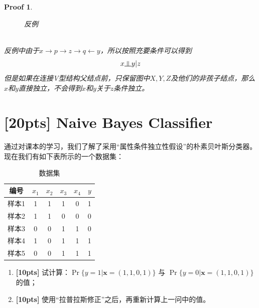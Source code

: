 \documentclass[a4paper,UTF8]{article}
\numberwithin{equation}{section}
\newtheorem*{myProof}{Proof}
\newcommand{\indep}{\rotatebox[origin=c]{90}{$\models$}}
\begin{document}
\begin{myProof}
\begin{enumerate}[(1)]
\begin{figure}[!ht]
	\caption{反例}
	\label{fig:label2}
\end{figure}\\
反例中由于$x \rightarrow p \rightarrow z \rightarrow q \leftarrow y$，所以按照充要条件可以得到
\begin{equation}
x \indep y | z
\end{equation}
但是如果在连接V型结构父结点前，只保留图中$X,Y,Z$及他们的非孩子结点，那么$x$和$y$直接独立，不会得到$x$和$y$关于$z$条件独立。
\end{enumerate}
\end{myProof}
\newpage
\section{[20pts] Naive Bayes Classifier}
	
	通过对课本的学习，我们了解了采用“属性条件独立性假设”的朴素贝叶斯分类器。现在我们有如下表所示的一个数据集：
	\begin{table}[htp]
		\centering
		\caption{数据集}\label{tab:aStrangeTable}
	\begin{tabular}{c|ccccc}
		\hline 
	编号	& $x_1$ & $x_2$ & $x_3$ & $x_4$ & $y$ \\ 
		\hline 
	样本1	& 1 & 1 & 1 & 0 & 1 \\ 
		\hline 
	样本2	& 1 & 1 & 0 & 0 & 0 \\ 
		\hline 
	样本3	& 0 & 0 & 1 & 1 & 0 \\ 
		\hline 
	样本4	& 1 & 0 & 1 & 1 & 1 \\ 
		\hline 
	样本5	& 0 & 0 & 1 & 1 & 1 \\ 
		\hline 
	\end{tabular}
	\end{table} 
	
	\begin{enumerate}[ {(}1{)}]
		\item \textbf{[10pts]} 试计算：$\Pr\{ y=1 | \mathbf{x}=(1,1,0,1) \}$ 与 $\Pr\{ y=0 | \mathbf{x}=(1,1,0,1) \}$ 的值；
		\item \textbf{[10pts]} 使用“拉普拉斯修正”之后，再重新计算上一问中的值。
	\end{enumerate}
	
\end{document}
